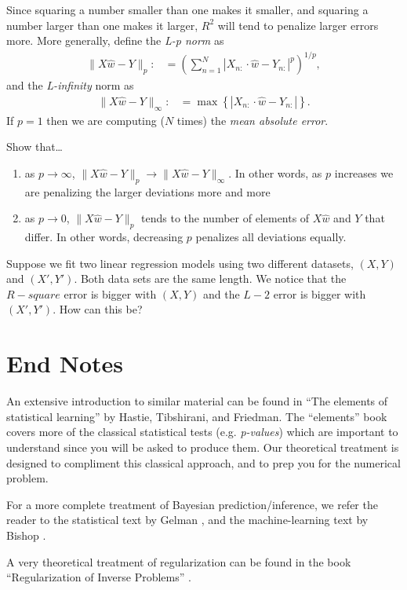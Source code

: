 Since squaring a number smaller than one makes it smaller, and squaring a number larger than one makes it larger, $R^2$ will tend to penalize larger errors more.  More generally, define the \emph{L-p norm} as 
\begin{align*}
  \|X\hat w - Y\|_p :&= \left( \sum_{n=1}^N |X_{n:}\cdot \hat w - Y_{n:}|^p \right)^{1/p},
\end{align*}
and the \emph{L-infinity} norm as
\begin{align*}
  \|X\hat w - Y\|_\infty :&= \max\left\{ |X_{n:}\cdot \hat w - Y_{n:}| \right\}.
\end{align*}
If $p=1$ then we are computing ($N$ times) the \emph{mean absolute error}.

\begin{exercise}
  Show that\ldots
  \begin{enumerate}
    \item as $p\to\infty$, $\|X\hat w - Y\|_p\to \|X\hat w - Y\|_\infty$.  In other words, as $p$ increases we are penalizing the larger deviations more and more
    \item as $p\to0$, $\|X\hat w - Y\|_p$ tends to the number of elements of $X\hat w$ and $Y$ that differ.  In other words, decreasing $p$ penalizes all deviations equally.
  \end{enumerate}
\end{exercise}

\begin{exercise}
  Suppose we fit two linear regression models using two different datasets, $(X,Y)$ and $(X', Y')$.  Both data sets are the same length.  We notice that the $R-square$ error is bigger with $(X, Y)$ and the $L-2$ error is bigger with $(X', Y')$.  How can this be?
\end{exercise}


\section{End Notes}

An extensive introduction to similar material can be found in ``The elements of statistical learning'' by Hastie, Tibshirani, and Friedman\cite{HastieElements}.  The ``elements'' book covers more of the classical statistical tests (e.g. \emph{p-values}) which are important to understand since you will be asked to produce them.  Our theoretical treatment is designed to compliment this classical approach, and to prep you for the numerical problem.

For a more complete treatment of Bayesian prediction/inference, we refer the reader to the statistical text by Gelman \cite{GelmanBayesian}, and the machine-learning text by Bishop \cite{BishopPattern}.

A very theoretical treatment of regularization can be found in the book ``Regularization of Inverse Problems'' \cite{HeinzRegularization}.
